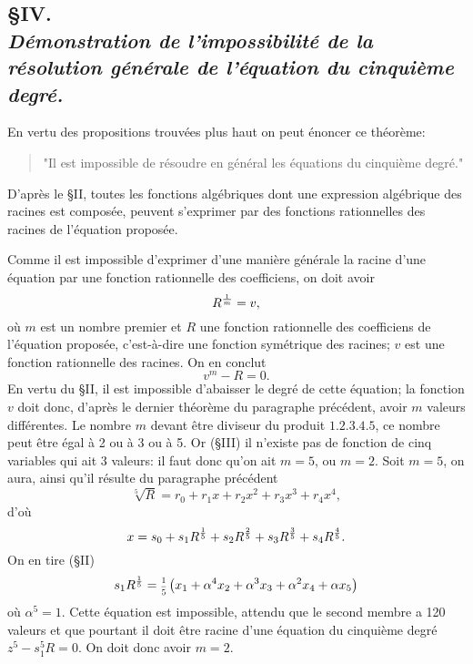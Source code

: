 \documentclass[oneside, 12 pt, leqno]{memoir}
\let\oldfrac\frac
\def\frac#1#2{\mathchoice{\text{\scalebox{.83}{${\oldfrac{#1}{#2}}$}}}{\text{\scalebox{.83}{${\displaystyle\oldfrac{#1}{#2}}$}}}{\genfrac{}{}{}{2}{#1}{#2}}{\genfrac{}{}{}{3}{#1}{#2}}}
\begin{document}
\subsection*{\S IV.\\
{\scriptsize\textit{ Démonstration de l'impossibilité de la résolution générale de l'équation du cinquième degré.}}}

En vertu des propositions trouvées plus haut on peut énoncer ce théorème:
\begin{quote}"Il est impossible de résoudre en général les équations du cinquième degré."\end{quote}

D'après le \S II, toutes les fonctions algébriques dont une expression algébrique des racines est composée, peuvent s'exprimer par des fonctions rationnelles des racines de l'équation proposée.

Comme il est impossible d'exprimer d'une manière générale la racine d'une équation par une fonction rationnelle des coefficiens, on doit avoir
\[R^{\frac{1}{m}}=v,\]
où \(m\) est un nombre premier et \(R\) une fonction rationnelle des coefficiens de l'équation proposée, c’est-à-dire une fonction symétrique des racines; \(v\) est une fonction rationnelle des racines. On en conclut
\[v^m-R=0.\]
En vertu du \S II, il est impossible d'abaisser le degré de cette équation; la fonction \(v\) doit donc, d'après le dernier théorème du paragraphe précédent, avoir \(m\) valeurs différentes. Le nombre \(m\) devant être diviseur du produit \(1.2.3.4.5\), ce nombre peut être égal à 2 ou à 3 ou à 5. Or (\S III) il n'existe pas de fonction de cinq variables qui ait 3 valeurs: il faut donc qu'on ait \(m=5\), ou \(m=2\). Soit \(m=5\), on aura, ainsi qu'il résulte du paragraphe précédent
\[\sqrt[5]{R}=r_0+r_1 x+r_2 x^2+r_3 x^3+r_4 x^4,\]
d'où
\[x=s_0+s_1 R^{\frac{1}{5}}+s_2 R^{\frac{2}{5}}+s_3 R^{\frac{3}{5}}+s_4 R^{\frac{4}{5}}.\]
On en tire (\S II)
\[s_1 R^{\frac{1}{5}}=\frac{1}{5}\left(x_1+\alpha^4 x_2+\alpha^3 x_3+\alpha^2 x_4+\alpha x_5\right)\]
où \(\alpha^5=1\). Cette équation est impossible, attendu que le second membre a 120 valeurs et que pourtant il doit être racine d'une équation du cinquième degré \(z^5-s_1^5 R=0\). On doit donc avoir \(m=2\).
\end{document}
